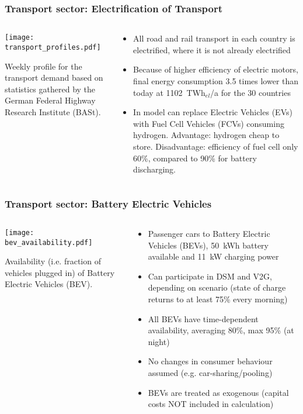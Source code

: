 \documentclass[10pt,aspectratio=169,dvipsnames]{beamer}
\def\el{${}_{el}$}
\let\olditem\item
\renewcommand{\item}{%
\olditem\vspace{5pt}}
\begin{document}
\begin{frame}
  \frametitle{Transport sector: Electrification of Transport}
\begin{columns}[T]
\begin{column}{7cm}
    \texttt{[image: transport\_profiles.pdf]}

    Weekly profile for the transport demand based on statistics gathered by the German Federal Highway Research Institute (BASt).

\end{column}
\begin{column}{7cm}
  \begin{itemize}
  \item All road and rail transport in each country is electrified, where it is not already electrified
    \item Because of higher efficiency of electric motors, final
      energy consumption 3.5 times lower than today at 1102~TWh\el/a for the 30
      countries
            \item In model can replace Electric Vehicles (EVs) with Fuel Cell Vehicles (FCVs) consuming hydrogen. Advantage: hydrogen cheap to store. Disadvantage: efficiency of fuel cell only 60\%, compared to 90\% for battery discharging.
  \end{itemize}
\end{column}
\end{columns}

\end{frame}



\begin{frame}
  \frametitle{Transport sector: Battery Electric Vehicles}
\begin{columns}[T]
\begin{column}{7cm}
    \texttt{[image: bev\_availability.pdf]}

    Availability (i.e. fraction of vehicles plugged in) of Battery Electric Vehicles (BEV).
\end{column}
\begin{column}{7cm}
  \begin{itemize}
  \item Passenger cars to Battery Electric Vehicles (BEVs), 50~kWh battery available and 11~kW charging power
  \item Can participate in DSM and V2G, depending on scenario (state of charge returns to at least 75\% every morning)
    \item All BEVs have time-dependent availability, averaging 80\%, max 95\% (at night)
    \item No changes in consumer behaviour assumed (e.g. car-sharing/pooling)
    \item BEVs are treated as exogenous (capital costs NOT included in calculation)
  \end{itemize}
\end{column}
\end{columns}

\end{frame}
\end{document}
